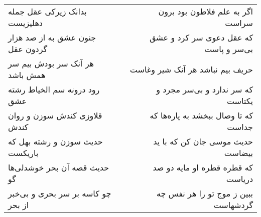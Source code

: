 \begin{center}
\begin{longtable}{l p{0.5cm} r}
\\
بدانک زیرکی عقل جمله دهلیزیست
&&
اگر به علم فلاطون بود برون سراست
\\
جنون عشق به از صد هزار گردون عقل
&&
که عقل دعوی سر کرد و عشق بی‌سر و پاست
\\
هر آنک سر بودش بیم سر همش باشد
&&
حریف بیم نباشد هر آنک شیر وغاست
\\
رود درونه سم الخیاط رشته عشق
&&
که سر ندارد و بی‌سر مجرد و یکتاست
\\
قلاوزی کندش سوزن و روان کندش
&&
که تا وصال ببخشد به پاره‌ها که جداست
\\
حدیث سوزن و رشته بهل که باریکست
&&
حدیث موسی جان کن که با ید بیضاست
\\
حدیث قصه آن بحر خوشدلی‌ها گو
&&
که قطره قطره او مایه دو صد دریاست
\\
چو کاسه بر سر بحری و بی‌خبر از بحر
&&
ببین ز موج تو را هر نفس چه گردشهاست
\\
\end{longtable}
\end{center}
